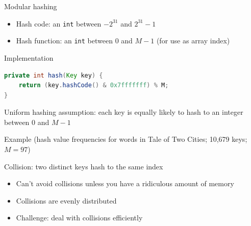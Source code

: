 \documentclass[8pt,a4paper,compress]{beamer}
\begin{document}
\begin{frame}[fragile]
\pause

Modular hashing
\begin{itemize}
\item Hash code: an \lstinline{int} between $-2^{31}$ and $2^{31} - 1$

\item Hash function: an \lstinline{int} between 0 and $M-1$ (for use as array index)
\end{itemize}

\pause
\bigskip

Implementation

\begin{lstlisting}[language=Java]
private int hash(Key key) { 
    return (key.hashCode() & 0x7fffffff) % M;
}
\end{lstlisting}

\pause
\bigskip

Uniform hashing assumption: each key is equally likely to hash to an integer between 0 and $M-1$

\pause
\bigskip

Example (hash value frequencies for words in Tale of Two Cities; 10,679 keys; $M = 97$)

\begin{center}
\end{center}

\pause
\bigskip

Collision: two distinct keys hash to the same index
\begin{itemize}
\item Can't avoid collisions unless you have a ridiculous amount of memory

\item Collisions are evenly distributed

\item Challenge: deal with collisions efficiently
\end{itemize}
\end{frame}
\end{document}
